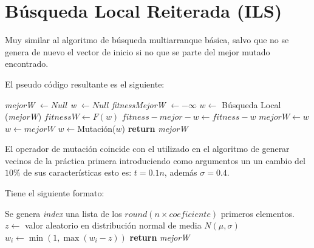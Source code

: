 
\section{Búsqueda Local Reiterada (ILS)}

Muy similar al algoritmo de búsqueda multiarranque 
básica, salvo que no se genera de nuevo 
el vector de inicio si no que se parte del mejor mutado
encontrado. 

El pseudo código resultante es el siguiente: 

\begin{algorithm}[H]
    \begin{algorithmic}
      \State\textit{mejorW} $\gets Null$ 
      \State\textit{w} $\gets Null$ 
      \State \textit{fitnessMejorW} $\gets - \infty$
        \State $w \gets $ Búsqueda Local (\textit{mejorW})
        \State $fitnessW \gets F(w)$
            \State $fitness-mejor-w \gets fitness-w$ 
            \State $mejorW \gets w$
        \EndIf
            \State $w \gets mejorW$ 
        \EndIf
        \State $w \gets $Mutación($w$)
        \EndFor
        \State \textbf{return } 
        \textit{mejorW}
      \EndProcedure
    \end{algorithmic}  
  \end{algorithm} 
El operador de mutación coincide con el utilizado 
en el algoritmo de generar vecinos de la práctica primera introduciendo como argumentos un
un cambio del $10\%$ de sus características
esto es: $t = 0.1 n$, además $\sigma = 0.4$.

Tiene el siguiente formato: 

\begin{algorithm}[H]
    \begin{algorithmic}
      \State Se genera \textit{index} una lista de los $round(n \times coeficiente)$ primeros elementos. 
      \State $z \gets$ valor aleatorio en distribución normal de media $N(\mu, \sigma)$
      \State $w_i \gets \min(1, \max(w_i - z))$
      \EndFor
        \State \textbf{return } 
        \textit{mejorW}
      \EndProcedure
    \end{algorithmic}  
  \end{algorithm}

